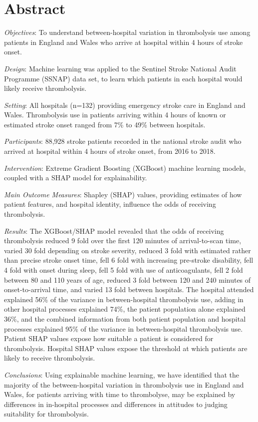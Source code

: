\section*{Abstract}

\emph{Objectives}: To understand between-hospital variation in thrombolysis use among patients in England and Wales who arrive at hospital within 4 hours of stroke onset.

\emph{Design}: Machine learning was applied to the Sentinel Stroke National Audit Programme (SSNAP)  data set, to learn which patients in each hospital would likely receive thrombolysis.

\emph{Setting}: All hospitals (n=132) providing emergency stroke care in England and Wales. Thrombolysis use in patients arriving within 4 hours of known or estimated stroke onset ranged from 7\% to 49\% between hospitals.

\emph{Participants}: 88,928 stroke patients recorded in the national stroke audit who arrived at hospital within 4 hours of stroke onset, from 2016 to 2018.

\emph{Intervention}: Extreme Gradient Boosting (XGBoost) machine learning models, coupled with a SHAP model for explainability.

\emph{Main Outcome Measures}: Shapley (SHAP) values, providing estimates of how patient features, and hospital identity, influence the odds of receiving thrombolysis.

\emph{Results}: The XGBoost/SHAP model revealed that the odds of receiving thrombolysis reduced 9 fold over the first 120 minutes of arrival-to-scan time, varied 30 fold depending on stroke severity, reduced 3 fold with estimated rather than precise stroke onset time, fell 6 fold with increasing pre-stroke disability, fell 4 fold with onset during sleep, fell 5 fold with use of anticoagulants, fell 2 fold between 80 and 110 years of age, reduced 3 fold between 120 and 240 minutes of onset-to-arrival time, and varied 13 fold between hospitals. The hospital attended explained 56\% of the variance in between-hospital thrombolysis use, adding in other hospital processes explained 74\%, the patient population alone explained 36\%, and the combined information from both patient population and hospital processes explained 95\% of the variance in between-hospital thrombolysis use. Patient SHAP values expose how suitable a patient is considered for thrombolysis. Hospital SHAP values expose the threshold at which patients are likely to receive thrombolysis.

\emph{Conclusions}: Using explainable machine learning, we have identified that the majority of the between-hospital variation in thrombolysis use in England and Wales, for patients arriving with time to thrombolyse, may be explained by differences in in-hospital processes and differences in attitudes to judging suitability for thrombolysis.